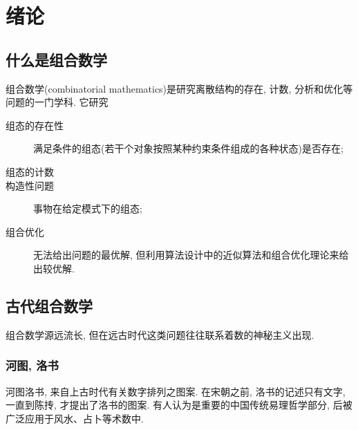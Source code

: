 \setcounter{chapter}{-1}
\chapter{绪论}

\section{什么是组合数学}

    \textsf{组合数学}(combinatorial mathematics)是研究离散结构的存在, 计数, 分析和优化等问题的一门学科. 它研究

    \begin{description}
        \item[组态的存在性]满足条件的\textsf{组态}(若干个对象按照某种约束条件组成的各种状态)是否存在;
        \item[组态的计数]
        \item[构造性问题] 事物在给定模式下的组态;
        \item[组合优化] 无法给出问题的最优解, 但利用算法设计中的近似算法和组合优化理论来给出较优解.
    \end{description}

\section{古代组合数学}

    组合数学源远流长, 但在远古时代这类问题往往联系着数的神秘主义出现. 

    \subsection{河图, 洛书}

        河图洛书, 来自上古时代有关数字排列之图案. 在宋朝之前, 洛书的记述只有文字, 一直到陈抟, 才提出了洛书的图案. 有人认为是重要的中国传统易理哲学部分, 后被广泛应用于风水、占卜等术数中. 
       
